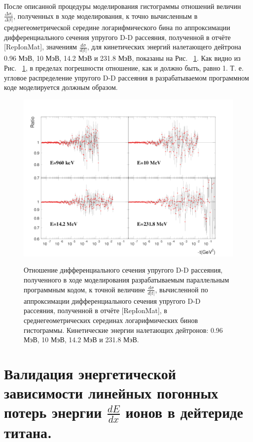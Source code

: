\documentclass[a4paper,12pt]{article}
\begin{document}
\begin{large}
	После описанной процедуры моделирования гистограммы отношений величин $\frac{\Delta \sigma_i}{\Delta |t|}$, полученных в ходе моделирования, к точно вычисленным в среднегеометрической середине логарифмического бина по аппроксимации дифференциального сечения упругого D-D рассеяния, полученной в отчёте [RepIonMat], значениям $\frac{d\sigma}{d|t|}$, для кинетических энергий налетающего дейтрона 0.96 МэВ, 10 МэВ, 14.2 МэВ и 231.8 МэВ, показаны на Рис. ~\ref{fig:CheckDDApproximationFillingBinsOfHistogram}.
	Как видно из Рис. ~\ref{fig:CheckDDApproximationFillingBinsOfHistogram}, в пределах погрешности отношение, как и должно быть, равно 1.
	Т. е. угловое распределение упругого D-D рассеяния в разрабатываемом программном коде моделируется должным образом.
	
\begin{figure}[ht]
  {
     \includegraphics[width=0.99\linewidth]{images/check_dd_approximation_filling_bins_of_histogram.pdf}
  }
  \caption{Отношение дифференциального сечения упругого D-D рассеяния, полученного в ходе моделирования разрабатываемым параллельным программным кодом, к точной величине $\frac{d\sigma}{d|t|}$, вычисленной по аппроксимации дифференциального сечения упругого D-D рассеяния, полученной в отчёте [RepIonMat], в среднегеометрических серединах логарифмических бинов гистограммы. Кинетические энергии налетающих дейтронов: 0.96 МэВ, 10 МэВ, 14.2 МэВ и 231.8 МэВ.}
  \label{fig:CheckDDApproximationFillingBinsOfHistogram}
\end{figure}


\clearpage{}
\section{Валидация энергетической зависимости линейных погонных потерь энергии $\frac{dE}{dx}$ ионов в дейтериде титана.}
\label{ValdEdx}

\end{large}
\end{document}
